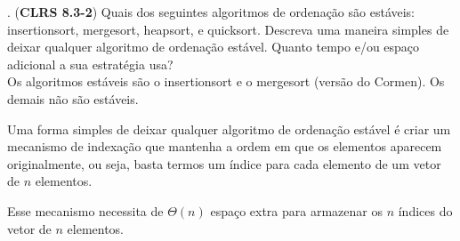 . (\textbf{CLRS 8.3-2}) Quais dos seguintes algoritmos de ordenação são estáveis: insertionsort, mergesort, heapsort, e quicksort. Descreva uma maneira simples de deixar qualquer algoritmo de ordenação estável. Quanto tempo e/ou espaço adicional a sua estratégia usa?\\[6pt]
Os algoritmos estáveis são o insertionsort e o mergesort (versão do Cormen). Os demais não são estáveis.

Uma forma simples de deixar qualquer algoritmo de ordenação estável é criar um mecanismo de indexação que mantenha a ordem em que os elementos aparecem originalmente, ou seja, basta termos um índice para cada elemento de um vetor de $n$ elementos.

Esse mecanismo necessita de $\Theta(n)$ espaço extra para armazenar os $n$ índices do vetor de $n$ elementos.
